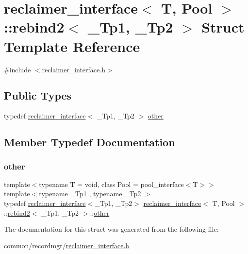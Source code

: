 \hypertarget{structreclaimer__interface_1_1rebind2}{}\section{reclaimer\+\_\+interface$<$ T, Pool $>$\+:\+:rebind2$<$ \+\_\+\+Tp1, \+\_\+\+Tp2 $>$ Struct Template Reference}
\label{structreclaimer__interface_1_1rebind2}


{\ttfamily \#include $<$reclaimer\+\_\+interface.\+h$>$}

\subsection*{Public Types}
\begin{DoxyCompactItemize}
\item 
typedef \hyperlink{classreclaimer__interface}{reclaimer\+\_\+interface}$<$ \+\_\+\+Tp1, \+\_\+\+Tp2 $>$ \hyperlink{structreclaimer__interface_1_1rebind2_a1131b2fe5630c6ba9acaf46cd12ca446}{other}
\end{DoxyCompactItemize}


\subsection{Member Typedef Documentation}
\mbox{\label{structreclaimer__interface_1_1rebind2_a1131b2fe5630c6ba9acaf46cd12ca446}} 
\subsubsection{\texorpdfstring{other}{other}}
{\footnotesize\ttfamily template$<$typename T  = void, class Pool  = pool\+\_\+interface$<$\+T$>$$>$ \\
template$<$typename \+\_\+\+Tp1 , typename \+\_\+\+Tp2 $>$ \\
typedef \hyperlink{classreclaimer__interface}{reclaimer\+\_\+interface}$<$\+\_\+\+Tp1, \+\_\+\+Tp2$>$ \hyperlink{classreclaimer__interface}{reclaimer\+\_\+interface}$<$ T, Pool $>$\+::\hyperlink{structreclaimer__interface_1_1rebind2}{rebind2}$<$ \+\_\+\+Tp1, \+\_\+\+Tp2 $>$\+::\hyperlink{structreclaimer__interface_1_1rebind2_a1131b2fe5630c6ba9acaf46cd12ca446}{other}}



The documentation for this struct was generated from the following file\+:\begin{DoxyCompactItemize}
\item 
common/recordmgr/\hyperlink{reclaimer__interface_8h}{reclaimer\+\_\+interface.\+h}\end{DoxyCompactItemize}
